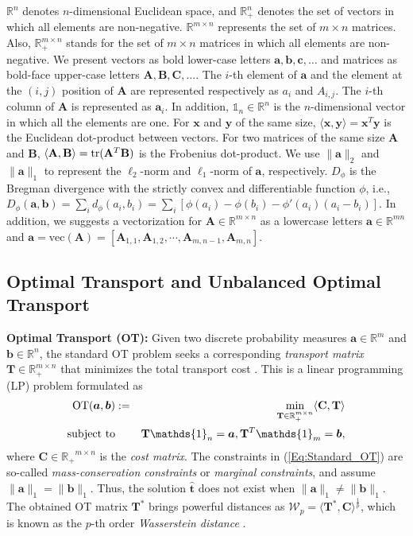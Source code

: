 \documentclass[twoside]{article}
\theoremstyle{plain}
\newcommand{\R}{\mathbb{R}}
\newcommand{\one}{\mathds{1}}
\newcommand{\mat}[1]{\mathbf{#1}}
\renewcommand{\vec}[1]{\bm{#1}}
\begin{document}
$\mathbb{R}^n$ denotes $n$-dimensional Euclidean space, and $\mathbb{R}^n_+$ denotes the set of vectors in which all elements are non-negative. $\mathbb{R}^{m \times n}$ represents the set of $m \times n$ matrices. Also, $\mathbb{R}^{m \times n}_+$ stands for the set of $m \times n$ matrices in which all elements are non-negative. We present vectors as bold lower-case letters $\vec{a},\vec{b},\vec{c},\dots$ and matrices as bold-face upper-case letters $\mat{A},\mat{B},\mat{C},\dots$. The $i$-th element of $\vec{a}$ and the element at the $(i,j)$ position of $\mat{A}$ are represented respectively as $a_i$ and ${A}_{i,j}$. The $i$-th column of $\mat{A}$ is represented as $\vec{a}_i$. In addition, $\one_n \in \mathbb{R}^n$ is the $n$-dimensional vector in which all the elements are one. For $\vec{x}$ and $\vec{y}$ of the same size, $\langle \vec{x},\vec{y} \rangle = \vec{x}^T\vec{y}$ is the Euclidean dot-product between vectors. For two matrices of the same size $\mat{A}$ and $\mat{B}$, $\langle \mat{A},\mat{B}\rangle={\rm tr}(\mat{A}^T\mat{B})$ is the Frobenius dot-product. We use $\|\vec{a}\|_2$ and $\|\vec{a}\|_1$ to represent the $\ell_2$-norm and $\ell_1$-norm of $\vec{a}$, respectively. $D_\phi$ is the Bregman divergence with the strictly convex and differentiable function $\phi$, i.e., $D_\phi(\vec{a},\vec{b})=\sum_{i} d_\phi(a_i, b_i)=\sum_i [\phi(a_i) - \phi(b_i) - \phi'(a_i)(a_i -b_i)]$. In addition, we suggests a vectorization for $\mat{A} \in \mathbb{R}^{m \times n}$ as a lowercase letters $\vec{a} \in \mathbb{R}^{mn}$ and $\vec{a}=\text{vec}(\mat{A})=[\mat{A}_{1,1}, \mat{A}_{1,2}, \cdots, \mat{A}_{m,n-1}, \mat{A}_{m,n}]$.
 


\subsection{Optimal Transport and Unbalanced Optimal Transport}
{\bf Optimal Transport (OT):} Given two discrete probability measures $\vec{a}\in \R^{m}$ and $\vec{b} \in \R^{n}$, the standard OT problem seeks a corresponding {\it transport matrix} $\mat{T} \in \R_{+}^{m \times n}$ that minimizes the total transport cost \citep{Kantorovich_1942}. This is a linear programming (LP) problem formulated as
\begin{eqnarray}
\label{Eq:Standard_OT}
\operatorname{OT}(\vec{a},\vec{b}) &:=& \min_{ \mat{T} \in \R_{+}^{m \times n}} \langle \mat{C}, \mat{T} \rangle \\
\text{subject\ to}&& \mat{T} \one_n= \vec{a}, \mat{T}^{T}\one_m = \vec{b}, \notag
\end{eqnarray}
where $\mat{C} \in \mathbb{R_{+}}^{m \times n}$ is the {\it cost matrix}. The constraints in (\ref{Eq:Standard_OT}) are so-called {\it mass-conservation constraints} or {\it marginal constraints}, and assume $\|\vec{a}\|_1 = \|\vec{b}\|_1$. Thus, the solution $\hat{\vec{t}}$ does not exist when $\|\vec{a}\|_1 \neq \|\vec{b}\|_1$. The obtained OT matrix $\mat{T}^*$ brings powerful distances as $\mathcal{W}_p = \langle \mat{T}^*,\mat{C} \rangle^{\frac{1}{p}}$, which is known as the $p$-th order {\it Wasserstein distance} \citep{Villani_2008_OTBook}. 
\end{document}
